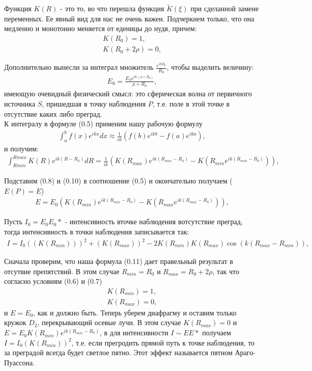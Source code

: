 \documentclass[__main__.tex]{subfiles}
\begin{document}
Функция $K(R)$ - это то, во что перешла функция $\tilde{K}(\xi)$ при сделанной замене переменных. Ее явный вид для нас не очень важен. Подчеркнем только, что она медленно и монотонно меняется от еденицы до нудя, причем:
\begin{gather}
K(R_0) = 1 , \\
K(R_0+2\rho) = 0 ,
\end{gather}

Дополнительно вынесли за интеграл множитель $\frac{e^{ikR_0}}{R_0}$, чтобы выделить величину:
\begin{gather}
E_0 = \frac{E_S e^{ik(\rho + R_0)}}{\rho + R_0} ,
\end{gather}
имеющую очевидный физический смысл: это сферическая волна от первичного источника $S$, пришедшая в точку наблюдения $P$, т.е. поле в этой точке в отсутствие каких либо преград.\\

К интегралу в формуле (0.5)
применим нашу рабочую формулу
\begin{gather}
\int_{a}^{b} f(x)e^{ikx}dx \approx \frac{1}{ik} (f(b)e^{ikb} - f(a)e^{ika}) ,
\end{gather}
и получим:
\begin{gather}
\int_{R{min}}^{R{max}} K(R)e^{ik(R-R_0)}dR = \frac{1}{ik}(K(R_{max})e^{ik(R_{max} - R_0)}-K(R_{min}e^{ik(R_{min} - R_0)})) ,
\end{gather}

Подставим (0.8) и (0.10)
в соотношение (0.5)
и окончательно получаем ($E(P)=E$)\\
\begin{gather}
E = E_0 (K(R_{min})e^{ik(R_{min} - R_0)}-K(R_{max}e^{ik(R_{max} - R_0)})) ,
\end{gather}

Пусть $I_0 = E_0 E_0*$ - интенсивность вточке наблюдения вотсутствие преград, тогда интенсивность в точки наблюдения записывается так:
\begin{gather}
I = I_0 ((K(R_{min})))^2 +(K(R_{max}))^2 - 2K(R_{min})K(R_{max})\cos(k(R_{max}-R_{min})) ,
\end{gather}

Сначала проверим, что наша формула (0.11)
дает правельный результат в отсутвие препятствий. В этом случае $R_{min} = R_0$ и $R_{max} = R_0 + 2\rho$, так что согласно условиям (0.6) и (0.7)
\begin{gather}
K(R_{min}) = 1 ,\\
K(R_{max}) = 0 ,
\end{gather}
и $E = E_0$, как и должно быть.
Теперь уберем диафрагму и оставим только кружок $D_2$, перекрывающий осевые лучи. В этом случае $K(R_{max}) = 0$ и $E=E_0 K(R_{min})e^{ik(R_{min}-R_0)}$, в для интенсивности $I \sim EE*$ получаем $I = I_0 (K(R_{min}))^2$, т.е. если прегродить прямой путь к точке наблюдения, то за преградой всегда будет светлое пятно. Этот эффект называется пятном Араго-Пуассона.\\
\end{document}
